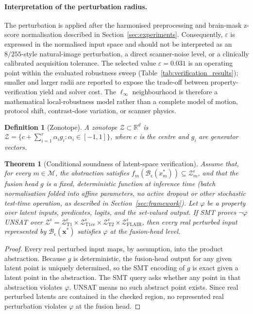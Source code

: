 \documentclass[preprint,11pt]{elsarticle}
\newtheorem{definition}{Definition}
\newtheorem{theorem}{Theorem}
\newcommand{\R}{\mathbb{R}}
\newcommand{\Z}{\mathcal{Z}}
\newcommand{\M}{\mathcal{M}}
\newcommand{\B}{\mathcal{B}}
\newcommand{\eps}{\varepsilon}
\begin{document}
\paragraph{Interpretation of the perturbation radius.}
The perturbation is applied after the harmonised preprocessing and brain-mask z-score normalisation described in Section~\ref{sec:experiments}. Consequently, $\eps$ is expressed in the normalised input space and should not be interpreted as an $8/255$-style natural-image perturbation, a direct scanner-noise level, or a clinically calibrated acquisition tolerance. The selected value $\eps=0.031$ is an operating point within the evaluated robustness sweep (Table~\ref{tab:verification_results}); smaller and larger radii are reported to expose the trade-off between property-verification yield and solver cost. The $\ell_\infty$ neighbourhood is therefore a mathematical local-robustness model rather than a complete model of motion, protocol shift, contrast-dose variation, or scanner physics.

\begin{definition}[Zonotope]
A zonotope $\Z\subset\R^d$ is $\Z=\{c+\sum_{i=1}^r \alpha_i g_i: \alpha_i\in[-1,1]\}$, where $c$ is the centre and $g_i$ are generator vectors.
\end{definition}

\begin{theorem}[Conditional soundness of latent-space verification]
\label{thm:soundness}
Assume that, for every $m\in\M$, the abstraction satisfies $f_m(\B_{\epsilon}(x_m^*))\subseteq\Z_m^\epsilon$, and that the fusion head $g$ is a fixed, deterministic function at inference time (batch normalisation folded into affine parameters, no active dropout or other stochastic test-time operation, as described in Section~\ref{sec:framework}). Let $\varphi$ be a property over latent inputs, predicates, logits, and the set-valued output. If SMT proves $\neg\varphi$ UNSAT over $\Z^\epsilon=\Z^\epsilon_{\mathrm{T1}}\times\Z^\epsilon_{\mathrm{T1ce}}\times\Z^\epsilon_{\mathrm{T2}}\times\Z^\epsilon_{\mathrm{FLAIR}}$, then every real perturbed input represented by $\B_\epsilon(\mathbf{x}^*)$ satisfies $\varphi$ at the fusion-head level.
\end{theorem}

\begin{proof}
Every real perturbed input maps, by assumption, into the product abstraction. Because $g$ is deterministic, the fusion-head output for any given latent point is uniquely determined, so the SMT encoding of $g$ is exact given a latent point in the abstraction. The SMT query asks whether any point in that abstraction violates $\varphi$. UNSAT means no such abstract point exists. Since real perturbed latents are contained in the checked region, no represented real perturbation violates $\varphi$ at the fusion head.
\end{proof}
\end{document}
